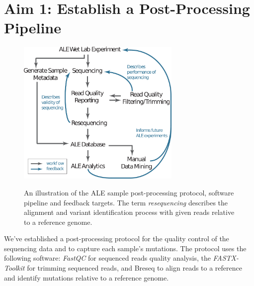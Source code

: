 \documentclass[12pt,final,masters,chapterheads]{ucsd}  %
\begin{document}
\chapter{Aim 1: Establish a Post-Processing Pipeline}


\begin{figure}[h!]
  \caption{An illustration of the ALE sample post-processing protocol, software pipeline and feedback targets. The term \textit{resequencing} describes the alignment and variant identification process with given reads relative to a reference genome.}
  \centering
  \includegraphics[width=0.7\textwidth]{post_processing_protocol.png}
  \label{fig:post_processing_protocol}
\end{figure}
We've established a post-processing protocol for the quality control of the sequencing data and to capture each sample's mutations. The protocol uses the following software: \textit{FastQC} \cite{Andrew:2010:Online} for sequenced reads quality analysis, the \textit{FASTX-Toolkit} \cite{FASTX-Toolkit} for trimming sequenced reads, and Breseq \cite{breseq_paper} to align reads to a reference and identify mutations relative to a reference genome.
\end{document}
